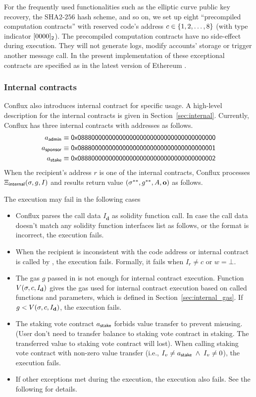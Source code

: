 For the frequently used functionalities such as the elliptic curve public key recovery, the SHA2-$256$ hash scheme, and so on, we set up eight ``precompiled computation contracts'' with reserved code's address $c\in{\left \{{1,2,\dots,8} \right \}}$ (with type indicator $[0000]_2$). The precompiled computation contracts have no side-effect during execution. They will not generate logs, modify accounts' storage or trigger another message call. 
In the present implementation of \name these exceptional contracts are specified as in the latest version of Ethereum \cite{ETH_yellow}.

\subsubsection{Internal contracts}

Conflux also introduces internal contract for specific usage. A high-level description for the internal contracts is given in Section~\ref{sec:internal}. 
%
Currently, Conflux has three internal contracts with addresses as follows. 
\begin{align}
	a_{\sf admin} \equiv {\sf 0x0888000000000000000000000000000000000000} \\ 
	a_{\sf sponsor} \equiv {\sf 0x0888000000000000000000000000000000000001} \\
	a_{\sf stake} \equiv {\sf 0x0888000000000000000000000000000000000002} 
\end{align}
%
When the recipient's address $r$ is one of the internal contracts, Conflux processes $\mathrm{\Xi}_{\sf internal}(\mathbf{\sigma},g,I)$ and results return value $\left(\mathbf{\sigma}^{**}, g^{**},  A, \mathbf{o} \right)$ as follows. 

The execution may fail in the following cases 
\begin{itemize}
	\item Conflux parses the call data $I_\mathbf{d}$ as solidity function call. In case the call data doesn't match any solidity function interfaces list as follows, or the format is incorrect, the execution fails. 
	\item When the recipient is inconsistent with the code address or internal contract is called by , the execution fails. Formally, it fails when $I_r\neq c$ or $w=\bot$. 
	\item The gas $g$ passed in is not enough for internal contract execution. Function $V(\mathbf{\sigma},c,I_\mathbf{d})$ gives the gas used for internal contract execution based on called functions and parameters, which is defined in Section~\ref{sec:internal_gas}. If $g<V(\mathbf{\sigma},c,I_\mathbf{d})$, the execution fails. 
	\item The staking vote contract $a_{\sf stake}$ forbids value transfer to prevent misusing. (User don't need to transfer balance to staking vote contract in staking. The transferred value to staking vote contract will lost). When calling staking vote contract with non-zero value transfer (i.e., $I_v\neq a_{\sf stake}\;\wedge \; I_v\neq 0$), the execution fails.
	\item If other exceptions met during the execution, the execution also fails. See the following for details. 
\end{itemize}

